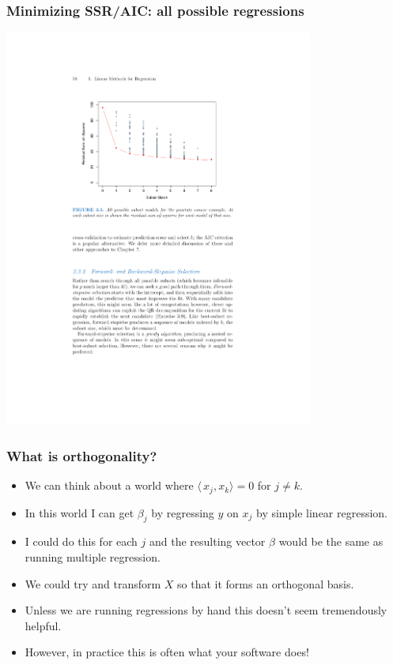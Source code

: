 \documentclass[xcolor=pdftex,dvipsnames,table,mathserif,aspectratio=169]{beamer}
\begin{document}
\begin{frame}
\frametitle{Minimizing SSR/AIC: all possible regressions}
\begin{center}
\includegraphics[width=4in]{./resources/subsetsaic}
\end{center}
\end{frame}

\begin{frame}
\frametitle{What is orthogonality?}
\begin{itemize}
\item We can think about a world where $\langle\, x_j, x_k \rangle =0$ for $j \neq k$.
\item In this world I can get $\beta_j$ by regressing $y$ on $x_j$ by simple linear regression.
\item I could do this for each $j$ and the resulting vector $\beta$ would be the same as running multiple regression.
\item We could try and transform $X$ so that it forms an \alert{orthogonal basis}.
\item Unless we are running regressions by hand this doesn't seem tremendously helpful.
\item However, in practice this is often what your software does!
\end{itemize}
\end{frame}
\end{document}
